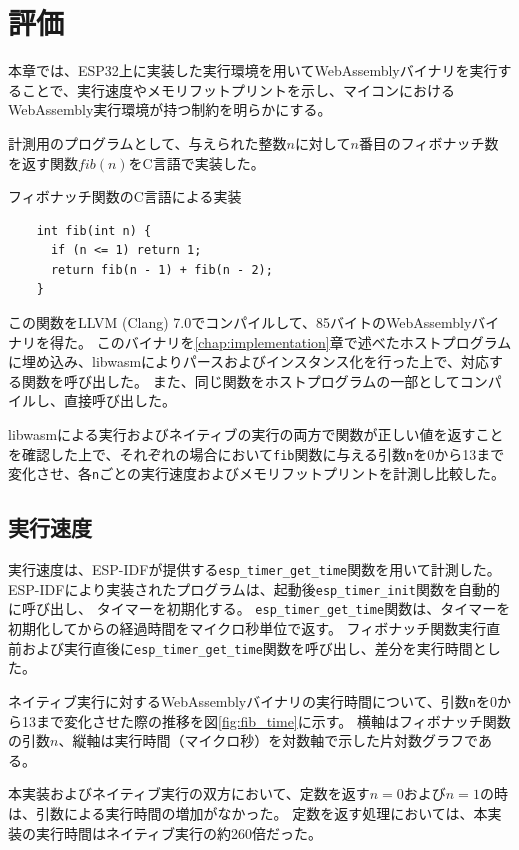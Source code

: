 \chapter{評価}
\label{chap:evaluation}

本章では、ESP32上に実装した実行環境を用いてWebAssemblyバイナリを実行することで、実行速度やメモリフットプリントを示し、マイコンにおけるWebAssembly実行環境が持つ制約を明らかにする。

計測用のプログラムとして、与えられた整数$n$に対して$n$番目のフィボナッチ数を返す関数$fib(n)$をC言語で実装した。

\begin{itembox}[l]{フィボナッチ関数のC言語による実装}
  \begin{verbatim}
    int fib(int n) {
      if (n <= 1) return 1;
      return fib(n - 1) + fib(n - 2);
    }
  \end{verbatim}
\end{itembox}

この関数をLLVM (Clang) 7.0でコンパイルして、85バイトのWebAssemblyバイナリを得た。
このバイナリを\ref{chap:implementation}章で述べたホストプログラムに埋め込み、libwasmによりパースおよびインスタンス化を行った上で、対応する関数を呼び出した。
また、同じ関数をホストプログラムの一部としてコンパイルし、直接呼び出した。

libwasmによる実行およびネイティブの実行の両方で関数が正しい値を返すことを確認した上で、それぞれの場合において\verb|fib|関数に与える引数\verb|n|を0から13まで変化させ、各\verb|n|ごとの実行速度およびメモリフットプリントを計測し比較した。

\section{実行速度}

実行速度は、ESP-IDFが提供する\verb|esp_timer_get_time|関数を用いて計測した。
ESP-IDFにより実装されたプログラムは、起動後\verb|esp_timer_init|関数を自動的に呼び出し、
タイマーを初期化する。
\verb|esp_timer_get_time|関数は、タイマーを初期化してからの経過時間をマイクロ秒単位で返す。
フィボナッチ関数実行直前および実行直後に\verb|esp_timer_get_time|関数を呼び出し、差分を実行時間とした。

ネイティブ実行に対するWebAssemblyバイナリの実行時間について、引数\verb|n|を0から13まで変化させた際の推移を図\ref{fig:fib_time}に示す。
横軸はフィボナッチ関数の引数$n$、縦軸は実行時間（マイクロ秒）を対数軸で示した片対数グラフである。

本実装およびネイティブ実行の双方において、定数を返す$n=0$および$n=1$の時は、引数による実行時間の増加がなかった。
定数を返す処理においては、本実装の実行時間はネイティブ実行の約260倍だった。

